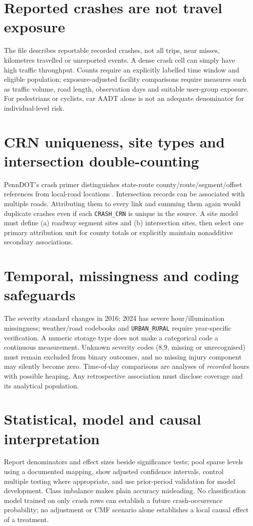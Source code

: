 \documentclass[11pt,a4paper,openany]{report}
\newcommand{\pathcode}[1]{\nolinkurl{#1}}
\begin{document}
\section{Reported crashes are not travel exposure}
The file describes reportable recorded crashes, not all trips, near misses, kilometres travelled or unreported events. A dense crash cell can simply have high traffic throughput. Counts require an explicitly labelled time window and eligible population; exposure-adjusted facility comparisons require measures such as traffic volume, road length, observation days and suitable user-group exposure. For pedestrians or cyclists, car AADT alone is not an adequate denominator for individual-level risk.

\section{CRN uniqueness, site types and intersection double-counting}
PennDOT's crash primer distinguishes state-route county/route/segment/offset references from local-road locations \cite{Primer}. Intersection records can be associated with multiple roads. Attributing them to every link and summing them again would duplicate crashes even if each \pathcode{CRASH_CRN} is unique in the source. A site model must define (a) roadway segment sites and (b) intersection sites, then select one primary attribution unit for county totals or explicitly maintain nonadditive secondary associations.

\section{Temporal, missingness and coding safeguards}
The severity standard changes in 2016; 2024 has severe hour/illumination missingness; weather/road codebooks and \pathcode{URBAN_RURAL} require year-specific verification. A numeric storage type does not make a categorical code a continuous measurement. Unknown severity codes (8,9, missing or unrecognised) must remain excluded from binary outcomes, and no missing injury component may silently become zero. Time-of-day comparisons are analyses of \emph{recorded} hours with possible heaping. Any retrospective association must disclose coverage and its analytical population.

\section{Statistical, model and causal interpretation}
Report denominators and effect sizes beside significance tests; pool sparse levels using a documented mapping, show adjusted confidence intervals, control multiple testing where appropriate, and use prior-period validation for model development. Class imbalance makes plain accuracy misleading. No classification model trained on only crash rows can establish a future crash-occurrence probability; no adjustment or CMF scenario alone establishes a local causal effect of a treatment.
\end{document}
